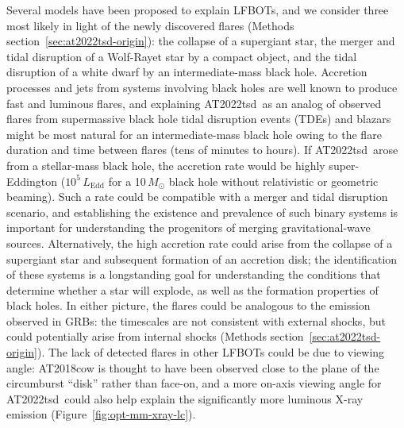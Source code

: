 \documentclass{nature_plusfigure}
\newcommand{\at}{AT2022tsd}
\begin{document}
Several models have been proposed to explain LFBOTs\cite{Metzger2022}, and we consider three most likely in light of the newly discovered flares (Methods section~\ref{sec:at2022tsd-origin}): the collapse of a supergiant star\cite{Perley2019,Margutti2019,Quataert2019}, the merger and tidal disruption of a Wolf-Rayet star by a compact object\cite{Metzger2022}, and the tidal disruption of a white dwarf by an intermediate-mass black hole\cite{Kuin2019,Perley2019}.
Accretion processes and jets from systems involving black holes are well known to produce fast and luminous flares,
and explaining \at\ as an analog of observed flares from supermassive black hole tidal disruption events (TDEs) and blazars might be most natural for an intermediate-mass black hole owing to the flare duration and time between flares (tens of minutes to hours).
If \at\ arose from a stellar-mass black hole, the accretion rate would be highly super-Eddington ($10^{5}\,L_\mathrm{Edd}$ for a 10\,$M_\odot$ black hole without relativistic or geometric beaming). Such a rate could be compatible with a merger and tidal disruption scenario\cite{Metzger2022}, and establishing the existence and prevalence of such binary systems is important for understanding the progenitors of merging gravitational-wave sources.
Alternatively, the high accretion rate could arise from the collapse of a supergiant star\cite{Quataert2019} and subsequent formation of an accretion disk; the identification of these systems is a longstanding goal for understanding the conditions that determine whether a star will explode, as well as the formation properties of black holes.
In either picture, the flares could be analogous to the emission observed in GRBs: the timescales are not consistent with external shocks, but could potentially arise from internal shocks (Methods section~\ref{sec:at2022tsd-origin}).
The lack of detected flares in other LFBOTs could be due to viewing angle: AT2018cow is thought to have been observed close to the plane of the circumburst ``disk'' rather than face-on\cite{Margutti2019,Chen2023b}, and a more on-axis viewing angle for \at\ could also help explain the significantly more luminous X-ray emission (Figure~\ref{fig:opt-mm-xray-lc}).

\newpage
\end{document}
